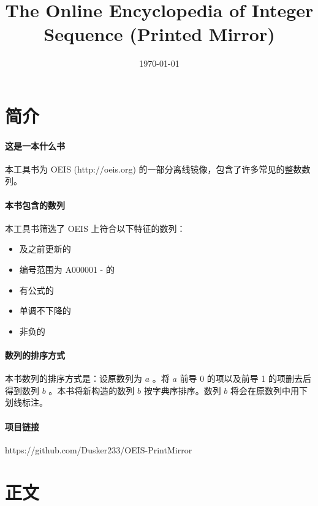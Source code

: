 \documentclass[a4paper]{article}
\begin{document}
\title{The Online Encyclopedia of Integer Sequence (Printed Mirror)}
\maketitle

\section{简介}

\paragraph{这是一本什么书}

本工具书为 OEIS (http://oeis.org) 的一部分离线镜像，包含了许多常见的整数数列。

\paragraph{本书包含的数列}

本工具书筛选了 OEIS 上符合以下特征的数列：

\begin{itemize}
\item \date{\today}及之前更新的
\item 编号范围为 A000001 - 的
\item 有公式的
\item 单调不下降的
\item 非负的
\end{itemize}

\paragraph{数列的排序方式}

本书数列的排序方式是：设原数列为 $a$ 。将 $a$ 前导 0 的项以及前导 1 的项删去后得到数列 $b$ 。本书将新构造的数列 $b$ 按字典序排序。数列 $b$ 将会在原数列中用下划线标注。

\paragraph{项目链接}

https://github.com/Dusker233/OEIS-PrintMirror

\newpage

\twocolumn

\footnotesize

\section{正文}


\end{document}
